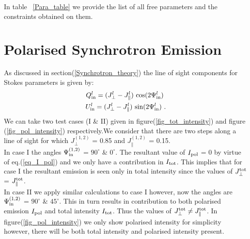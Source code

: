 \documentclass[usenatbib]{mnras}
\begin{document}
\appendix


In table ~\ref{Para_table} we provide the list of all free parameters and the constraints obtained on them.

\section{Polarised Synchrotron Emission}
\label{Appendix_A}
As discussed in section(\ref{Synchrotron_theory}) the line of sight components for Stokes parameters is given by:
\begin{eqnarray}
Q^l_{\rm in} = ({J_{\perp}^l} - J_{\parallel}^l) \ {\cos}(2\Psi^l_{\rm in}) \ \\ U^l_{\rm in} = ({J_{\perp}^l} - J_{\parallel}^l) \ {\sin}(2\Psi^l_{\rm in}) \ .
\end{eqnarray}
We can take two test cases (I \& II) given in figure(\ref{fig_tot_intensity}) and figure (\ref{fig_pol_intensity}) respectively.We consider that there are two steps along a line of sight for which ${J_{\perp}^{(1,2)}}$ = 0.85 and $J_{\parallel}^{(1,2)}$  = 0.15. 
\\ In case I the angles $\Psi_{\rm in}^{(1,2)}$ = $90^{\circ}$ \& $0^{\circ}$. The resultant value of $I_{\rm pol}$ = 0 by virtue of eq.(\ref{eq_I_pol}) and we only have a contribution in $I_{\rm tot}$. This implies that for case I the resultant emission is seen only in total intensity since the values of $J_{\perp}^{\rm tot}$ = $J_{\parallel}^{\rm tot}$. 
\\ In case II we apply similar calculations to case I however, now the angles are $\Psi_{\rm in}^{(1,2)}$ = $90^{\circ}$ \& $45^{\circ}$. This in turn results in contribution to both polarised emission $I_{\rm pol}$ and total intensity $I_{\rm tot}$. Thus the values of $J_{\perp}^{\rm tot} \neq J_{\parallel}^{\rm tot}$. In figure(\ref{fig_pol_intensity}) we only show polarised intensity for simplicity however, there will be both total intensity and polarised intensity present.
\end{document}
